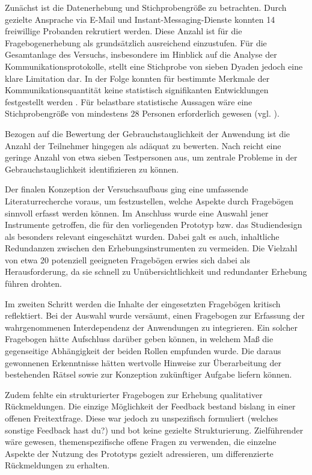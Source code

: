 Zunächst ist die Datenerhebung und Stichprobengröße zu betrachten. Durch gezielte Ansprache via E-Mail und Instant-Messaging-Dienste konnten 14 freiwillige Probanden rekrutiert werden. Diese Anzahl ist für die Fragebogenerhebung als grundsätzlich ausreichend einzustufen. Für die Gesamtanlage des Versuchs, insbesondere im Hinblick auf die Analyse der Kommunikationsprotokolle, stellt eine Stichprobe von sieben Dyaden jedoch eine klare Limitation dar. In der Folge konnten für bestimmte Merkmale der Kommunikationsquantität keine statistisch signifikanten Entwicklungen festgestellt werden . Für belastbare statistische Aussagen wäre eine Stichprobengröße von mindestens 28 Personen erforderlich gewesen (vgl. \citealp[S. 158]{cohen_power_1992}). 

Bezogen auf die Bewertung der Gebrauchstauglichkeit der Anwendung ist die Anzahl der Teilnehmer hingegen als adäquat zu bewerten. Nach  \citet[S. 3088]{karwowski_determining_2006} reicht eine geringe Anzahl von etwa sieben Testpersonen aus, um zentrale Probleme in der Gebrauchstauglichkeit identifizieren zu können.

Der finalen Konzeption der Versuchsaufbaus ging eine umfassende Literaturrecherche voraus, um festzustellen, welche Aspekte durch Fragebögen sinnvoll erfasst werden können. Im Anschluss wurde eine Auswahl jener Instrumente getroffen, die für den vorliegenden Prototyp bzw. das Studiendesign als besonders relevant eingeschätzt wurden. Dabei galt es auch, inhaltliche Redundanzen zwischen den Erhebungsinstrumenten zu vermeiden. Die Vielzahl von etwa 20 potenziell geeigneten Fragebögen erwies sich dabei als Herausforderung, da sie schnell zu Unübersichtlichkeit und redundanter Erhebung führen drohten. 

Im zweiten Schritt werden die Inhalte der eingesetzten Fragebögen kritisch reflektiert. Bei der Auswahl wurde versäumt, einen Fragebogen zur Erfassung der wahrgenommenen Interdependenz der Anwendungen zu integrieren. Ein solcher Fragebogen hätte Aufschluss darüber geben können, in welchem Maß die gegenseitige Abhängigkeit der beiden Rollen empfunden wurde. Die daraus gewonnenen Erkenntnisse hätten wertvolle Hinweise zur Überarbeitung der bestehenden Rätsel sowie zur Konzeption zukünftiger Aufgabe liefern können.

Zudem fehlte ein strukturierter Fragebogen zur Erhebung qualitativer Rückmeldungen. Die einzige Möglichkeit der Feedback bestand bislang in einer offenen Freitextfrage. Diese war jedoch zu unspezifisch formuliert (welches sonstige Feedback hast du?) und bot keine gezielte Strukturierung. Zielführender wäre gewesen, themenspezifische offene Fragen zu verwenden, die einzelne Aspekte der Nutzung des Prototyps gezielt adressieren, um differenzierte Rückmeldungen zu erhalten.

